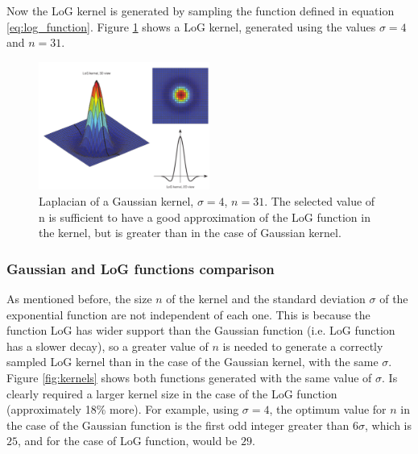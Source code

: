 \documentclass{ipol}
\numberwithin{equation}{section}
\numberwithin{table}{section}
\begin{document}
Now the LoG kernel is generated by sampling the function defined in equation \ref{eq:log_function}. 
Figure \ref{fig:log_kernel} shows a LoG kernel, generated using the values $\sigma=4$ and $n=31$.

\begin{figure}
	\centering
	\includegraphics[width=0.5\textwidth]{kernel_log.pdf}
	\caption{Laplacian of a Gaussian kernel, $\sigma=4$, $n=31$. The selected value of n is sufficient 
to have a good approximation of the LoG function in the kernel, but is greater than in the case of 
Gaussian kernel.}
	\label{fig:log_kernel}
\end{figure}


\subsubsection{Gaussian and LoG functions comparison}
\label{kernelcomparison}

As mentioned before, the size $n$ of the kernel and the standard deviation $\sigma$ of the exponential function 
are not independent of each one. This is because the function LoG has wider support than the
Gaussian function (i.e. LoG function has a slower decay), so a greater value of $n$ is needed to 
generate a correctly sampled LoG kernel than in the case of the Gaussian kernel, with the same $\sigma$.\\

Figure \ref{fig:kernels} shows both functions generated with the same value of $\sigma$. Is clearly 
required a larger kernel size in the case of the LoG function (approximately 18\% more). For 
example, using $\sigma=4$, the optimum value for $n$ in the case of the Gaussian function is the 
first odd integer greater than $6\sigma$, which is $25$, and for the case of LoG function, would 
be $29$.
\end{document}
